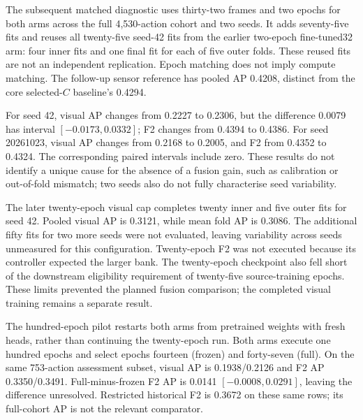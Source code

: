 The subsequent matched diagnostic uses thirty-two frames and two epochs for both arms
across the full 4,530-action cohort and two seeds. It adds seventy-five fits and reuses
all twenty-five seed-42 fits from the earlier two-epoch fine-tuned32 arm: four inner
fits and one final fit for each of five outer folds. These reused fits are not an
independent replication. Epoch matching does not imply compute matching. The follow-up
sensor reference has pooled AP 0.4208, distinct from the core selected-$C$ baseline's
0.4294.

For seed 42, visual AP changes from 0.2227 to 0.2306, but the difference 0.0079 has
interval $[-0.0173, 0.0332]$; F2 changes from 0.4394 to 0.4386. For seed 20261023, visual
AP changes from 0.2168 to 0.2005, and F2 from 0.4352 to 0.4324. The corresponding paired
intervals include zero. These results do not identify a unique cause for the absence of
a fusion gain, such as calibration or out-of-fold mismatch; two seeds also do not fully
characterise seed variability.

The later twenty-epoch visual cap completes twenty inner and five outer fits for seed
42. Pooled visual AP is 0.3121, while mean fold AP is 0.3086. The additional fifty fits
for two more seeds were not evaluated, leaving variability across seeds unmeasured
for this configuration. Twenty-epoch F2 was not executed because its controller expected the
larger bank. The twenty-epoch checkpoint also fell short of the downstream eligibility requirement
of twenty-five source-training epochs. These limits prevented the planned fusion
comparison; the completed visual training remains a separate result.

The hundred-epoch pilot restarts both arms from pretrained weights with fresh heads,
rather than continuing the twenty-epoch run. Both arms execute one hundred epochs and
select epochs fourteen (frozen) and forty-seven (full). On the same 753-action
assessment subset, visual AP is 0.1938/0.2126 and F2 AP 0.3350/0.3491. Full-minus-frozen
F2 AP is 0.0141 $[-0.0008, 0.0291]$, leaving the difference unresolved. Restricted
historical F2 is 0.3672 on these same rows; its full-cohort AP is not the relevant
comparator.

